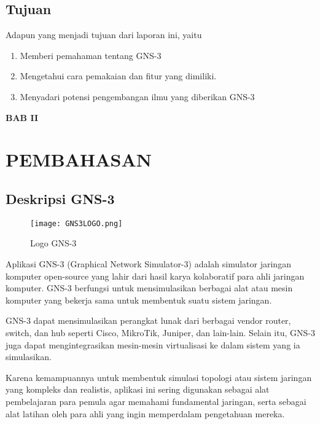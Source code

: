 \documentclass[12pt, a4paper]{article}
\begin{document}
    \subsection{Tujuan}

      Adapun yang menjadi tujuan dari laporan ini, yaitu

      \begin{enumerate}[label=\arabic*.]
        \item Memberi pemahaman tentang GNS-3
        \item Mengetahui cara pemakaian dan fitur yang dimiliki.
        \item Menyadari potensi pengembangan ilmu yang diberikan GNS-3
      \end{enumerate}

  \newpage

  \begin{center}
    \large{\textbf{BAB II}}

    \section*{PEMBAHASAN}
  \end{center}

  \vspace{1cm}


    \subsection{Deskripsi GNS-3}

      \begin{figure}[h]
          \centering
          \texttt{[image: GNS3LOGO.png]}
          \caption{\small{Logo GNS-3}}
      \end{figure}

  Aplikasi GNS-3 (Graphical Network Simulator-3) adalah simulator jaringan komputer
  open-source yang lahir dari hasil karya kolaboratif para ahli 
  jaringan komputer. GNS-3 berfungsi untuk mensimulasikan berbagai alat atau mesin
  komputer yang bekerja sama untuk membentuk suatu sistem jaringan.

  GNS-3 dapat mensimulasikan perangkat lunak dari berbagai vendor router, switch, dan hub
  seperti Cisco, MikroTik, Juniper, dan lain-lain. Selain itu, GNS-3 juga dapat mengintegrasikan
  mesin-mesin virtualisasi ke dalam sistem yang ia simulasikan.

  Karena kemampuannya untuk membentuk simulasi topologi atau sistem jaringan yang
  kompleks dan realistis, aplikasi ini sering digunakan sebagai alat pembelajaran
  para pemula agar memahami fundamental jaringan, serta sebagai alat latihan oleh
  para ahli yang ingin memperdalam pengetahuan mereka.
\end{document}
